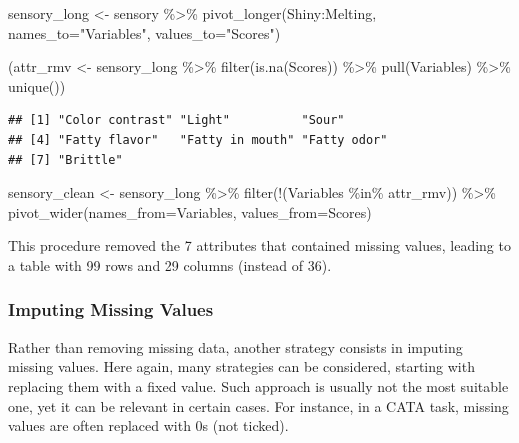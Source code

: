 \documentclass[
]{krantz}
\makeatletter
\newenvironment{Shaded}{\begin{snugshade}}{\end{snugshade}}
\newcommand{\AttributeTok}[1]{\textcolor[rgb]{0.61,0.61,0.61}{#1}}
\newcommand{\FunctionTok}[1]{\textcolor[rgb]{0,0,0}{#1}}
\newcommand{\NormalTok}[1]{#1}
\newcommand{\OtherTok}[1]{\textcolor[rgb]{0.37,0.37,0.37}{#1}}
\newcommand{\SpecialCharTok}[1]{\textcolor[rgb]{0,0,0}{#1}}
\newcommand{\StringTok}[1]{\textcolor[rgb]{0.5,0.5,0.5}{#1}}
\newenvironment{kframe}{%
\medskip{}
\setlength{\fboxsep}{.8em}
 \def\at@end@of@kframe{}%
 \ifinner\ifhmode%
  \def\at@end@of@kframe{\end{minipage}}%
  \begin{minipage}{\columnwidth}%
 \fi\fi%
 \def\FrameCommand##1{\hskip\@totalleftmargin \hskip-\fboxsep
 \colorbox{shadecolor}{##1}\hskip-\fboxsep
     \hskip-\linewidth \hskip-\@totalleftmargin \hskip\columnwidth}%
 \MakeFramed {\advance\hsize-\width
   \@totalleftmargin\z@ \linewidth\hsize
   \@setminipage}}%
 {\par\unskip\endMakeFramed%
 \at@end@of@kframe}
\renewenvironment{Shaded}{\begin{kframe}}{\end{kframe}}
\makeatother
\begin{document}
\begin{Shaded}
\begin{Highlighting}[]
\NormalTok{sensory\_long }\OtherTok{\textless{}{-}}\NormalTok{ sensory }\SpecialCharTok{\%\textgreater{}\%} 
  \FunctionTok{pivot\_longer}\NormalTok{(Shiny}\SpecialCharTok{:}\NormalTok{Melting, }\AttributeTok{names\_to=}\StringTok{"Variables"}\NormalTok{, }\AttributeTok{values\_to=}\StringTok{"Scores"}\NormalTok{)}

\NormalTok{(attr\_rmv }\OtherTok{\textless{}{-}}\NormalTok{ sensory\_long }\SpecialCharTok{\%\textgreater{}\%} 
  \FunctionTok{filter}\NormalTok{(}\FunctionTok{is.na}\NormalTok{(Scores)) }\SpecialCharTok{\%\textgreater{}\%} 
  \FunctionTok{pull}\NormalTok{(Variables) }\SpecialCharTok{\%\textgreater{}\%} 
  \FunctionTok{unique}\NormalTok{())}
\end{Highlighting}
\end{Shaded}

\begin{verbatim}
## [1] "Color contrast" "Light"          "Sour"          
## [4] "Fatty flavor"   "Fatty in mouth" "Fatty odor"    
## [7] "Brittle"
\end{verbatim}

\begin{Shaded}
\begin{Highlighting}[]
\NormalTok{sensory\_clean }\OtherTok{\textless{}{-}}\NormalTok{ sensory\_long }\SpecialCharTok{\%\textgreater{}\%} 
  \FunctionTok{filter}\NormalTok{(}\SpecialCharTok{!}\NormalTok{(Variables }\SpecialCharTok{\%in\%}\NormalTok{ attr\_rmv)) }\SpecialCharTok{\%\textgreater{}\%} 
  \FunctionTok{pivot\_wider}\NormalTok{(}\AttributeTok{names\_from=}\NormalTok{Variables, }\AttributeTok{values\_from=}\NormalTok{Scores)}
\end{Highlighting}
\end{Shaded}

This procedure removed the 7 attributes that contained missing values, leading to a table with 99 rows and 29 columns (instead of 36).

\hypertarget{imputing-missing-values}{%
\subsubsection{Imputing Missing Values}\label{imputing-missing-values}}

Rather than removing missing data, another strategy consists in imputing missing values. Here again, many strategies can be considered, starting with replacing them with a fixed value. Such approach is usually not the most suitable one, yet it can be relevant in certain cases. For instance, in a CATA task, missing values are often replaced with 0s (not ticked).
\end{document}
